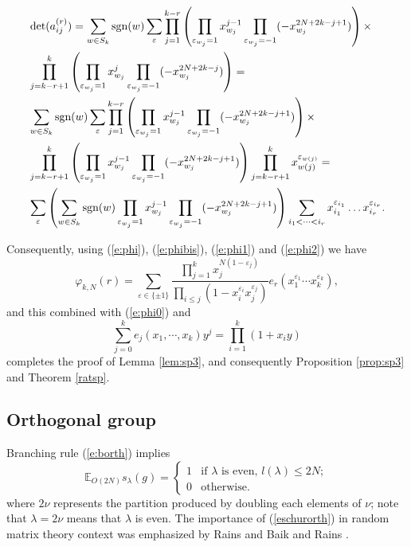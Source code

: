 \documentclass[11pt]{amsart}
\newcommand{\sgn}{{\hbox{\rm sgn}}}
\begin{document}
\begin{equation}\label{e:phi2}
\begin{aligned}
&\det(a_{ij}^{(r)})= \sum_{w \in S_k} \sgn(w) \sum_{\varepsilon}
\prod_{j=1}^{k-r}\left(\prod_{\varepsilon_{w_{j}}=1} x_{w_j}^{j-1}
\prod_{\varepsilon_{w_{j}}=-1}
(-x_{w_j}^{2N+2k-j+1})\right)\times\\&
\prod_{j=k-r+1}^{k}\left(\prod_{\varepsilon_{w_{j}}=1} x_{w_j}^{j}
\prod_{\varepsilon_{w_{j}}=-1} (-x_{w_j}^{2N+2k-j})\right)=\\&
\sum_{w \in S_k} \sgn(w) \sum_{\varepsilon}
\prod_{j=1}^{k-r}\left(\prod_{\varepsilon_{w_{j}}=1} x_{w_j}^{j-1}
\prod_{\varepsilon_{w_{j}}=-1} (-x_{w_j}^{2N+2k-j+1})\right)\times
\\&
\prod_{j=k-r+1}^{k}\left(\prod_{\varepsilon_{w_{j}}=1}
x_{w_j}^{j-1} \prod_{\varepsilon_{w_{j}}=-1}
(-x_{w_j}^{2N+2k-j+1})\right) \prod_{j=k-r+1}^{k}
x_{w(j)}^{\varepsilon_{w(j)}}=\\& \sum_{\varepsilon}\left(\sum_{w
\in S_k} \sgn(w)\prod_{\varepsilon_{w_{j}}=1} x_{w_j}^{j-1}
\prod_{\varepsilon_{w_{j}}=-1} (-x_{w_j}^{2N+2k-j+1})\right)
\sum_{i_1 <  \dots < i_r}x_{i_1}^{\varepsilon_{i_1}} \dots
x_{i_r}^{\varepsilon_{i_r}}.
\end{aligned}
\end{equation}

Consequently, using (\ref{e:phi}), (\ref{e:phibis}),
(\ref{e:phi1}) and (\ref{e:phi2}) we have
\begin{equation}
  \varphi_{k, N} ( r ) = \sum_{\varepsilon \in \{ \pm 1 \}} \frac{\prod_{j =
  1}^k x_j^{N ( 1 - \varepsilon_j )}}{\prod_{i \leqslant j} ( 1 -
  x_i^{\varepsilon_i} x_j^{\varepsilon_j} )} e_r ( x_1^{\varepsilon_1} \cdots
  x_k^{\varepsilon_k} ),
\end{equation}
and this combined with (\ref{e:phi0}) and
\[ \sum_{j = 0}^k e_j ( x_1, \cdots, x_k ) y^j = \prod_{i = 1}^k ( 1 + x_i y )
\]
completes the proof of Lemma \ref{lem:sp3}, and consequently
Proposition \ref{prop:sp3} and Theorem \ref{ratsp}.

\subsection{Orthogonal group}

Branching rule (\ref{e:borth}) implies
\begin{equation}
  \label{eschurorth} \mathbb{E}_{O ( 2 N )} s_{\lambda} ( g ) =
  \left\{\begin{array}{ll}
    1 & \text{if $\lambda$ is even, $l ( \lambda ) \leqslant 2 N$} ;\\
    0 & \text{otherwise} .
  \end{array}\right.
\end{equation}
where $2 \nu$ represents the partition produced by doubling each
elements of $\nu$; note that $\lambda = 2 \nu$ means that
$\lambda$ is even. The importance of (\ref{eschurorth}) in random
matrix theory context was emphasized by Rains  {\cite{Ra98}} and
Baik and Rains {\cite{BR02}}.
\end{document}
